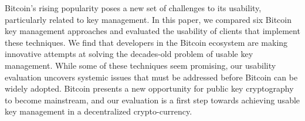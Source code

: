 Bitcoin's rising popularity poses a new set of challenges to its usability, particularly related to key management. In this paper, we compared six Bitcoin key management approaches and evaluated the usability of clients that implement these techniques. We find that developers in the Bitcoin ecosystem are making innovative attempts at solving the decades-old problem of usable key management. While some of these techniques seem promising, our usability evaluation uncovers systemic issues that must be addressed before Bitcoin can be widely adopted. Bitcoin presents a new opportunity for public key cryptography to become mainstream, and our evaluation is a first step towards achieving usable key management in a decentralized crypto-currency. 




